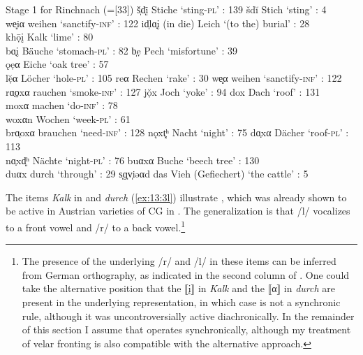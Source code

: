 
\ea%
\label{ex:13:3}Stage 1 for Rinchnach (=[33])
\ea\label{ex:13:3a} š̩d̩ị̄ \tab Stiche \tab  ‘sting-\textsc{pl}’ : 139
\ex\label{ex:13:3b} šdĭ \tab Stich \tab ‘sting’ : 4\\
    we͈iα \tab weihen \tab ‘sanctify-\textsc{inf}’ : 122
\ex\label{ex:13:3c} id̩lɑ̣\k{i} \tab (in die) Leich \tab ‘(to the) burial’ : 28\\
    khọ̄\k{i} \tab Kalk \tab  ‘lime’ : 80\\
    bɑ̣\k{i} \tab Bäuche \tab ‘stomach-\textsc{pl}' : 82
\ex\label{ex:13:3d} b̩ẹ \tab Pech \tab ‘misfortune’ : 39\\
    ǫẹα \tab Eiche \tab ‘oak tree’ : 57\\
    lẹ̆α \tab Löcher \tab ‘hole-\textsc{pl}’ : 105
\ex\label{ex:13:3e} reα \tab Rechen \tab ‘rake’ : 30
\ex\label{ex:13:3f} we͈α \tab weihen \tab ‘sanctify-\textsc{inf}’ : 122
\ex\label{ex:13:3g} rɑ̣o̤xα \tab rauchen \tab ‘smoke-\textsc{inf}’ : 127
\ex\label{ex:13:3h} jọ̆x \tab Joch \tab ‘yoke’ : 94
\ex\label{ex:13:3i} dox \tab Dach \tab ‘roof’ : 131\\
    moxα \tab machen \tab ‘do-\textsc{inf}’ : 78\\
    woxαn \tab Wochen \tab ‘week-\textsc{pl}’ : 61\\
    brɑ̣oxα \tab brauchen \tab ‘need-\textsc{inf}’ : 128
\ex\label{ex:13:3j} nǫxt͓ʰ \tab Nacht \tab ‘night’ : 75
\ex\label{ex:13:3k} dɑ̣xα \tab Dächer \tab ‘roof-\textsc{pl}’ : 113\\
    nɑ̣xd͈ʰ \tab Nächte \tab  ‘night-\textsc{pl}’ : 76
\ex\label{ex:13:3l} buαxα \tab Buche \tab ‘beech tree’ : 130\\
    duαx \tab durch \tab ‘through’ : 29
\ex\label{ex:13:3m} s̩ɡ̩v̩iəαd \tab das Vieh (Gefiechert) \tab ‘the cattle’ : 5
\z
\z 

The items \textit{Kalk} in  and \textit{durch} (\ref{ex:13:3l}) illustrate , which was already shown to be active in Austrian varieties of CG in . The generalization is that /l/ vocalizes to a front vowel and /r/ to a back vowel.\footnote{{The presence of the underlying /r/ and /l/ in these items can be inferred from German orthography, as indicated in the second column of . One could take the alternative position that the ⟦\k{i}⟧ in} \textrm{\textit{Kalk}} \textrm{and the ⟦α⟧ in} \textrm{\textit{durch}} \textrm{are present in the underlying representation, in which case  is not a synchronic rule, although it was uncontroversially active diachronically. In the remainder of this section I assume that  operates synchronically, although my treatment of velar fronting is also compatible with the alternative approach.}}

